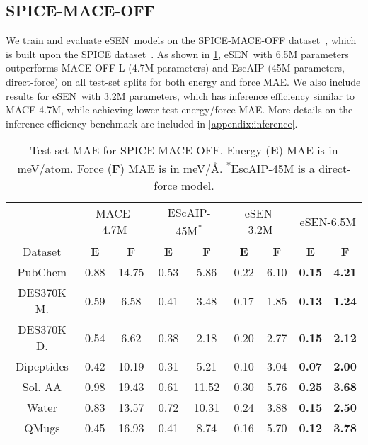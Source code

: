 \documentclass[twocolumn]{fairmeta}
\newcommand{\ourmodel}{eSEN}
\begin{document}
\subsection{SPICE-MACE-OFF}

We train and evaluate \ourmodel\ models on the SPICE-MACE-OFF dataset~\citep{kovacs2023mace}, which is built upon the SPICE dataset~\citep{eastman2023spice}. As shown in \cref{tab:spice_mace_off}, \ourmodel\ with 6.5M parameters outperforms MACE-OFF-L (4.7M parameters) and EscAIP (45M parameters, direct-force) on all test-set splits for both energy and force MAE. We also include results for \ourmodel\ with 3.2M parameters, which has inference efficiency similar to MACE-4.7M, while achieving lower test energy/force MAE. More details on the inference efficiency benchmark are included in \cref{appendix:inference}.

\begin{table}[t]
\caption{
Test set MAE for SPICE-MACE-OFF. Energy (\textbf{E}) MAE is in meV/atom. Force (\textbf{F}) MAE is in meV/\AA. \textsuperscript{*}EscAIP-45M is a direct-force model.
\label{tab:spice_mace_off}
}
\begin{adjustbox}{width=\linewidth}
\begin{tabular}{c|cc|cc|cc|cc}
\toprule
 & \multicolumn{2}{c|}{MACE-4.7M} & \multicolumn{2}{c|}{EScAIP-45M\textsuperscript{*}} & \multicolumn{2}{c|}{\ourmodel-3.2M} & \multicolumn{2}{c}{\ourmodel-6.5M} \\
 
 Dataset & \textbf{E} & \textbf{F} & \textbf{E} & \textbf{F} & \textbf{E} & \textbf{F} & \textbf{E} & \textbf{F} \\
\midrule
PubChem & 0.88 & 14.75 & 0.53 & 5.86 & 0.22 & 6.10 & \textbf{0.15} & \textbf{4.21} \\
DES370K M. & 0.59 & 6.58 & 0.41 & 3.48 & 0.17 & 1.85 & \textbf{0.13} & \textbf{1.24} \\
DES370K D. & 0.54 & 6.62 & 0.38 & 2.18 & 0.20 & 2.77 & \textbf{0.15} & \textbf{2.12} \\
Dipeptides & 0.42 & 10.19 & 0.31 & 5.21 & 0.10 & 3.04 & \textbf{0.07} & \textbf{2.00} \\
Sol. AA & 0.98 & 19.43 & 0.61 & 11.52 & 0.30 & 5.76 & \textbf{0.25} & \textbf{3.68} \\
Water & 0.83 & 13.57 & 0.72 & 10.31 & 0.24 & 3.88 & \textbf{0.15} & \textbf{2.50} \\
QMugs & 0.45 & 16.93 & 0.41 & 8.74 & 0.16 & 5.70 & \textbf{0.12} & \textbf{3.78} \\
\bottomrule
\end{tabular}
\end{adjustbox}
\end{table}
\end{document}
